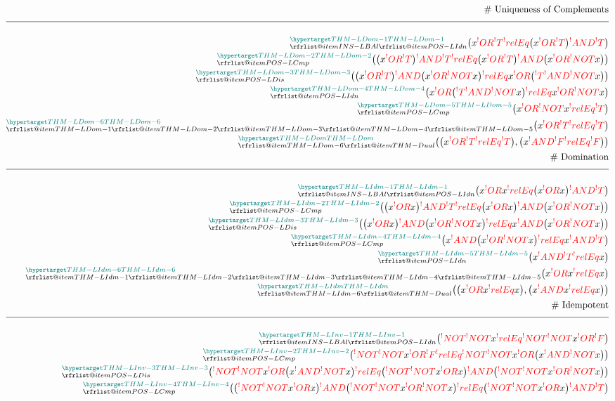 \documentclass[a4paper]{article}
\makeatletter
\newcommand\rfrlist[1]{\forcsvlist{\rfrlist@item}{#1}}
\newcommand\rfrlist@item[1]{\rfr{#1}\\}
\newcommand{\thmlink}[2]{{}_{\substack{\rfrlist{#1}}}^{\dfn{#2}}}
\newcommand{\eqComment}[1]{\text{  \# #1}}
\newcommand{\n}{\\[1.5ex] \hline \nonumber \\[0ex]}
\newcommand{\m}{\nonumber \\}
\def\ml{\mleft}
\def\mr{\mright}
\newcommand{\cusand}{,}
\makeatother
\begin{document}
\begin{tcolorbox}
\begin{align}
\m \eqComment{Uniqueness of Complements}
    \n \thmlink{INS-LBAl, POS-LIdn}{THM-LDom-1} \ml(x \rfr{OR} \rfr{T} \rfr{relEq} \ml(x \rfr{OR} \rfr{T}\mr) \rfr{AND} \rfr{T}\mr)
\m \thmlink{POS-LCmp}{THM-LDom-2} \ml(\ml(x \rfr{OR} \rfr{T}\mr) \rfr{AND} \rfr{T} \rfr{relEq} \ml(x \rfr{OR} \rfr{T}\mr) \rfr{AND} \ml(x \rfr{OR} \rfr{NOT} x\mr)\mr)
\m \thmlink{POS-LDis}{THM-LDom-3} \ml(\ml(x \rfr{OR} \rfr{T}\mr) \rfr{AND} \ml(x \rfr{OR} \rfr{NOT} x\mr) \rfr{relEq} x \rfr{OR} \ml(\rfr{T} \rfr{AND} \rfr{NOT} x\mr)\mr)
\m \thmlink{POS-LIdn}{THM-LDom-4} \ml(x \rfr{OR} \ml(\rfr{T} \rfr{AND} \rfr{NOT} x\mr) \rfr{relEq} x \rfr{OR} \rfr{NOT} x\mr)
\m \thmlink{POS-LCmp}{THM-LDom-5} \ml(x \rfr{OR} \rfr{NOT} x \rfr{relEq} \rfr{T}\mr)
\m \thmlink{THM-LDom-1, THM-LDom-2, THM-LDom-3, THM-LDom-4, THM-LDom-5}{THM-LDom-6} \ml(x \rfr{OR} \rfr{T} \rfr{relEq} \rfr{T}\mr)
\m \thmlink{THM-LDom-6, THM-Dual}{THM-LDom} \ml(\ml(x \rfr{OR} \rfr{T} \rfr{relEq} \rfr{T}\mr) \cusand \ml(x \rfr{AND} \rfr{F} \rfr{relEq} \rfr{F}\mr)\mr)
\m \eqComment{Domination}
    \n \thmlink{INS-LBAl, POS-LIdn}{THM-LIdm-1} \ml(x \rfr{OR} x \rfr{relEq} \ml(x \rfr{OR} x\mr) \rfr{AND} \rfr{T}\mr) 
\m \thmlink{POS-LCmp}{THM-LIdm-2} \ml(\ml(x \rfr{OR} x\mr) \rfr{AND} \rfr{T} \rfr{relEq} \ml(x \rfr{OR} x\mr) \rfr{AND} \ml(x \rfr{OR} \rfr{NOT} x\mr)\mr) 
\m \thmlink{POS-LDis}{THM-LIdm-3} \ml(\ml(x \rfr{OR} x\mr) \rfr{AND} \ml(x \rfr{OR} \rfr{NOT} x\mr) \rfr{relEq} x \rfr{AND} \ml(x \rfr{OR} \rfr{NOT} x\mr)\mr) 
\m \thmlink{POS-LCmp}{THM-LIdm-4} \ml(x \rfr{AND} \ml(x \rfr{OR} \rfr{NOT} x\mr) \rfr{relEq} x \rfr{AND} \rfr{T}\mr) 
\m \thmlink{POS-LIdn}{THM-LIdm-5} \ml(x \rfr{AND} \rfr{T} \rfr{relEq} x\mr) 
\m \thmlink{THM-LIdm-1, THM-LIdm-2, THM-LIdm-3, THM-LIdm-4, THM-LIdm-5}{THM-LIdm-6} \ml(x \rfr{OR} x \rfr{relEq} x\mr) 
\m \thmlink{THM-LIdm-6, THM-Dual}{THM-LIdm} \ml(\ml(x \rfr{OR} x \rfr{relEq} x\mr) , \ml(x \rfr{AND} x \rfr{relEq} x\mr)\mr) 
\m \eqComment{Idempotent}
    \n \thmlink{INS-LBAl, POS-LIdn}{THM-LInv-1} \ml(\rfr{NOT} \rfr{NOT} x \rfr{relEq} \rfr{NOT} \rfr{NOT} x \rfr{OR} \rfr{F}\mr)
\m \thmlink{POS-LCmp}{THM-LInv-2} \ml(\rfr{NOT} \rfr{NOT} x \rfr{OR} \rfr{F} \rfr{relEq} \rfr{NOT} \rfr{NOT} x \rfr{OR} \ml(x \rfr{AND} \rfr{NOT} x\mr)\mr) 
\m \thmlink{POS-LDis}{THM-LInv-3} \ml(\rfr{NOT} \rfr{NOT} x \rfr{OR} \ml(x \rfr{AND} \rfr{NOT} x\mr)\rfr{relEq} \ml(\rfr{NOT} \rfr{NOT} x \rfr{OR} x\mr) \rfr{AND} \ml(\rfr{NOT} \rfr{NOT} x \rfr{OR} \rfr{NOT} x\mr)\mr) 
\m \thmlink{POS-LCmp}{THM-LInv-4} \ml(\ml(\rfr{NOT} \rfr{NOT} x \rfr{OR} x\mr) \rfr{AND} \ml(\rfr{NOT} \rfr{NOT} x \rfr{OR} \rfr{NOT} x\mr) \rfr{relEq} \ml(\rfr{NOT} \rfr{NOT} x \rfr{OR} x\mr) \rfr{AND} \rfr{T}\mr) 

\end{align}
\end{tcolorbox}
\end{document}
